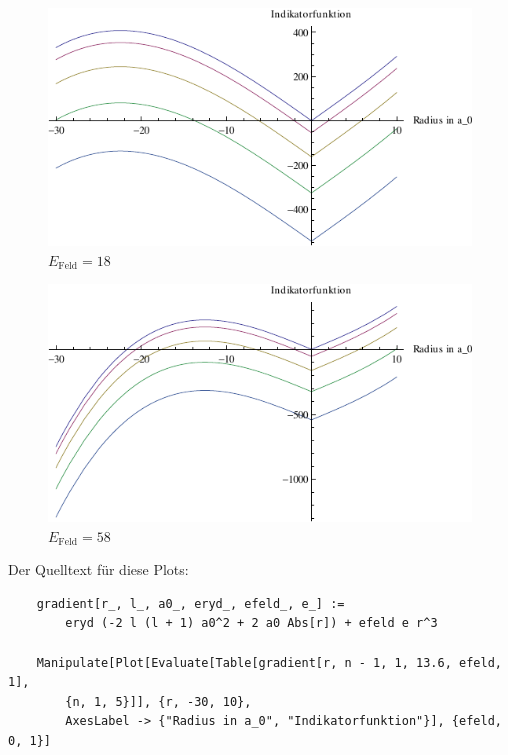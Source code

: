 \begin{figure}
		\centering
		\includegraphics[width=\textwidth]{3-Indikator-018.pdf}
		\caption{$E_\text{Feld} = 18$}
		\label{fig:6}
\end{figure}

\begin{figure}
		\centering
		\includegraphics[width=\textwidth]{3-Indikator-058.pdf}
		\caption{$E_\text{Feld} = 58$}
		\label{fig:7}
\end{figure}

Der Quelltext für diese Plots:
\begin{verbatim}
	gradient[r_, l_, a0_, eryd_, efeld_, e_] := 
		eryd (-2 l (l + 1) a0^2 + 2 a0 Abs[r]) + efeld e r^3

	Manipulate[Plot[Evaluate[Table[gradient[r, n - 1, 1, 13.6, efeld, 1],
		{n, 1, 5}]], {r, -30, 10},
		AxesLabel -> {"Radius in a_0", "Indikatorfunktion"}], {efeld, 0, 1}]
\end{verbatim}


\IfFileExists{\bibliographyfile}{
}{}




